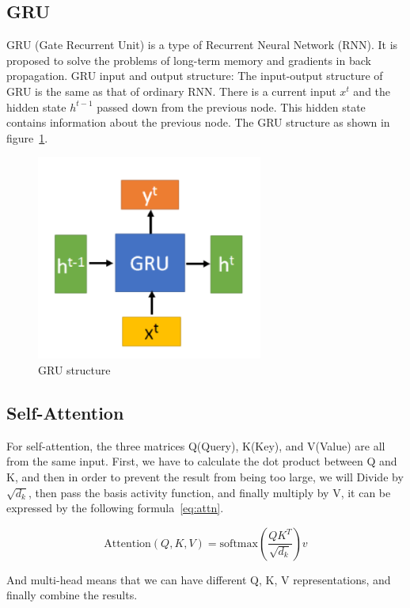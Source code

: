 \documentclass{article}
\begin{document}
\subsection{GRU}

GRU (Gate Recurrent Unit) is a type of Recurrent Neural Network (RNN).
It is proposed to solve the problems of long-term memory and
gradients in back propagation.
GRU input and output structure:
The input-output structure of GRU is the same as that of ordinary RNN.
There is a current input $x^t$ and the hidden state $h^{t-1}$ passed down
from the previous node. This hidden state contains information
about the previous node.
The GRU structure as shown in figure~\ref{fig:GRU}.

\begin{figure}
    \centering
    \includegraphics[scale=0.5]{GRU}
    \caption{GRU structure}
    \label{fig:GRU}
\end{figure}

\subsection{Self-Attention}

For self-attention\cite{vaswani2017attention}, the three matrices Q(Query), K(Key), and V(Value) are
all from the same input. First, we have to calculate the dot product
between Q and K, and then in order to prevent the result
from being too large, we will Divide by $\sqrt{d_k}$,
then pass the basis activity function, and finally multiply by V,
it can be expressed by the following formula~\ref{eq:attn}.

\begin{equation}
    \label{eq:attn}
    \textrm{Attention}(Q,K,V)=\textrm{softmax}(\frac{QK^{T}}{\sqrt{d_{k}}})v
\end{equation}

And multi-head means that we can have different Q, K, V representations,
and finally combine the results.
\end{document}
